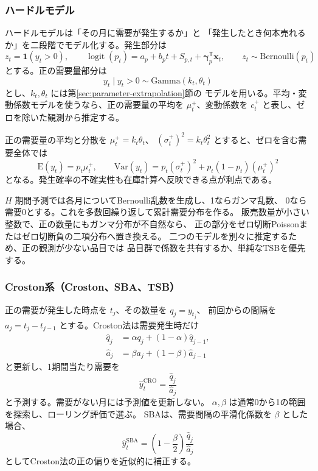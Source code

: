 \documentclass[a4paper,11pt]{jsarticle}
\begin{document}
\subsubsection{ハードルモデル}

ハードルモデル\cite{mullahy1986}は「その月に需要が発生するか」と
「発生したとき何本売れるか」を二段階でモデル化する。発生部分は
\[
z_t=\mathbf{1}(y_t>0),\qquad
\operatorname{logit}(p_t)=a_p+b_pt+S_{p,t}
+\boldsymbol{\gamma}_p^{\mathsf T}\boldsymbol{x}_t,\qquad
z_t\sim\mathrm{Bernoulli}(p_t)
\]
とする。正の需要量部分は
\[
y_t\mid y_t>0\sim\mathrm{Gamma}(k_t,\theta_t)
\]
とし、$k_t,\theta_t$ には第\ref{sec:parameter-extrapolation}節の
モデルを用いる。平均・変動係数モデルを使うなら、正の需要量の平均を
$\mu_t^+$、変動係数を $c_t^+$ と表し、ゼロを除いた観測から推定する。

正の需要量の平均と分散を $\mu_t^+=k_t\theta_t$、
$(\sigma_t^+)^2=k_t\theta_t^2$ とすると、ゼロを含む需要全体では
\[
\mathrm{E}(y_t)=p_t\mu_t^+,\qquad
\mathrm{Var}(y_t)=p_t(\sigma_t^+)^2+
p_t(1-p_t)(\mu_t^+)^2
\]
となる。発生確率の不確実性も在庫計算へ反映できる点が利点である。

$H$ 期間予測では各月についてBernoulli乱数を生成し、1ならガンマ乱数、
0なら需要0とする。これを多数回繰り返して累計需要分布を作る。
販売数量が小さい整数で、正の数量にもガンマ分布が不自然なら、
正の部分をゼロ切断Poissonまたはゼロ切断負の二項分布へ置き換える。
二つのモデルを別々に推定するため、正の観測が少ない品目では
品目群で係数を共有するか、単純なTSBを優先する。

\subsubsection{Croston系（Croston、SBA、TSB）}

正の需要が発生した時点を $t_j$、その数量を $q_j=y_{t_j}$、
前回からの間隔を $a_j=t_j-t_{j-1}$ とする。Croston法は需要発生時だけ
\begin{align}
\hat q_j&=\alpha q_j+(1-\alpha)\hat q_{j-1},\\
\hat a_j&=\beta a_j+(1-\beta)\hat a_{j-1}
\end{align}
と更新し、1期間当たり需要を
\[
\hat y_t^{\mathrm{CRO}}=\frac{\hat q_j}{\hat a_j}
\]
と予測する。需要がない月には予測値を更新しない。
$\alpha,\beta$ は通常0から1の範囲を探索し、ローリング評価で選ぶ。
SBAは、需要間隔の平滑化係数を $\beta$ とした場合、
\[
\hat y_t^{\mathrm{SBA}}=
\left(1-\frac{\beta}{2}\right)\frac{\hat q_j}{\hat a_j}
\]
としてCroston法の正の偏りを近似的に補正する。
\end{document}
